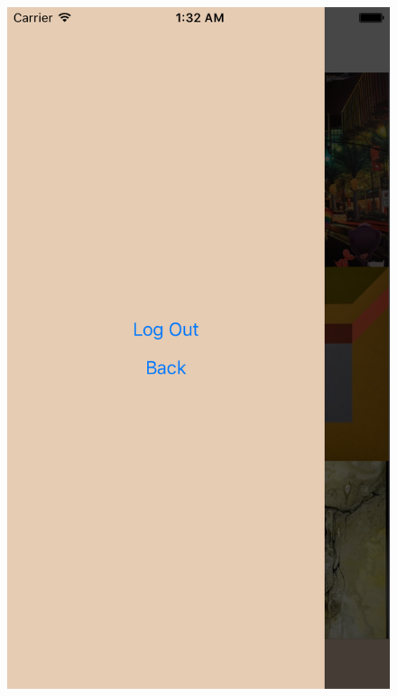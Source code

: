 \begin{figure}[H]
\begin{minipage}[b]{0.285\linewidth}
    \includegraphics[width=\linewidth]{Appendix/VerticalPrototype/menu.png}
  \end{minipage}
\end{figure}

